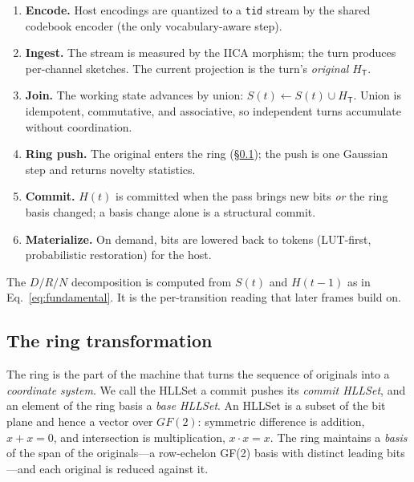 \documentclass[11pt,a4paper]{article}
\theoremstyle{remark}
\newcommand{\HLL}{\ensuremath{H}}                     %
\newcommand{\Tab}{\ensuremath{\mathsf{T}}}            %
\begin{document}
\begin{enumerate}[leftmargin=*,nosep]
  \item \textbf{Encode.} Host encodings are quantized to a \texttt{tid} stream by
    the shared codebook encoder (the only vocabulary-aware step).
  \item \textbf{Ingest.} The stream is measured by the IICA morphism; the turn
    produces per-channel sketches. The current projection is the turn's
    \emph{original} $\HLL_\Tab$.
  \item \textbf{Join.} The working state advances by union:
    $S(t) \leftarrow S(t)\cup \HLL_\Tab$. Union is idempotent, commutative, and
    associative, so independent turns accumulate without coordination.
  \item \textbf{Ring push.} The original enters the ring (\S\ref{sec:ring});
    the push is one Gaussian step and returns novelty statistics.
  \item \textbf{Commit.} $H(t)$ is committed when the pass brings new bits
    \emph{or} the ring basis changed; a basis change alone is a structural
    commit.
  \item \textbf{Materialize.} On demand, bits are lowered back to tokens
    (LUT-first, probabilistic restoration) for the host.
\end{enumerate}

The $D/R/N$ decomposition is computed from $S(t)$ and $H(t{-}1)$ as in
Eq.~\eqref{eq:fundamental}. It is the per-transition reading that later frames
build on.

\subsection{The ring transformation}
\label{sec:ring}

The ring is the part of the machine that turns the sequence of originals into a
\emph{coordinate system}. We call the HLLSet a commit pushes its \emph{commit
HLLSet}, and an element of the ring basis a \emph{base HLLSet}. An HLLSet is a
subset of the bit plane and hence a
vector over $GF(2)$: symmetric difference is addition,
$x+x=0$, and intersection is multiplication, $x\cdot x=x$. The ring maintains a
\emph{basis} of the span of the originals---a row-echelon GF(2) basis with
distinct leading bits---and each original is reduced against it.
\end{document}
